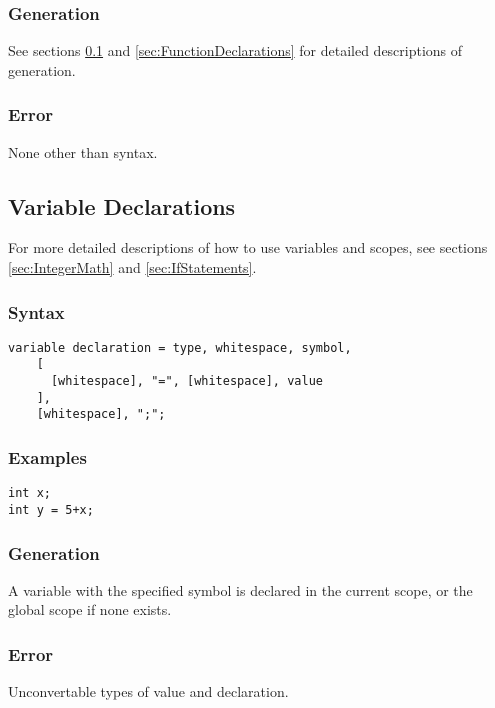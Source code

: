 \documentclass[10pt,a4paper]{article}
\begin{document}
\subsubsection{Generation}
See sections \ref{sec:VariableDeclarations} and \ref{sec:FunctionDeclarations} for detailed descriptions of generation.

\subsubsection{Error}
None other than syntax.

\newpage



\subsection{Variable Declarations}
\label{sec:VariableDeclarations}
For more detailed descriptions of how to use variables and scopes, see sections \ref{sec:IntegerMath} and \ref{sec:IfStatements}.

\subsubsection{Syntax}
\begin{verbatim}
variable declaration = type, whitespace, symbol,
    [
      [whitespace], "=", [whitespace], value
    ],
    [whitespace], ";";
\end{verbatim}

\subsubsection{Examples}
\begin{verbatim}
int x;
int y = 5+x;
\end{verbatim}

\subsubsection{Generation}
A variable with the specified symbol is declared in the current scope, or the global scope if none exists.

\subsubsection{Error}
Unconvertable types of value and declaration. 

\newpage
\end{document}

